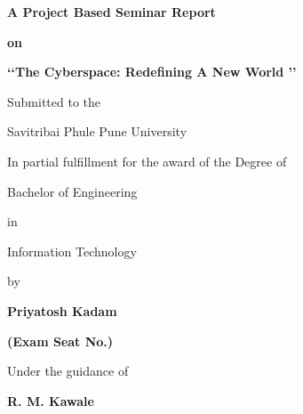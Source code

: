 \documentclass[11pt,a4paper]{article}
\begin{document}
\newpage
\pagestyle{empty}
 
\begin{center}
\textbf{\Large{A Project Based Seminar Report}}
\end{center}

\begin{center}\textbf{on}
\end{center}
			
\begin{center}
\textbf{ \Large{\textbf{ \lq \lq The Cyberspace: Redefining A New World \rq \rq}}}
\end{center}
     
\begin{center}Submitted to the 
\end{center}

\begin{center}\large{Savitribai Phule Pune University}
\end{center}

\begin{center}In partial fulfillment for the award of the Degree of
\end{center}

\begin{center}\large{Bachelor of Engineering} 
\end{center}

\begin{center}in
\end{center}

\begin{center}\large{Information Technology}
\end{center}

\begin{center}by
\end{center}

\begin{center}
\textbf{\Large{ \textbf{Priyatosh Kadam}}}
\end{center}

\begin{center}\textbf{(Exam Seat No.)}
\end{center}

\begin{center}Under the guidance of
\end{center}

\begin{center}\textbf{\Large{\textbf{R. M. Kawale}}}
\end{center}
\end{document}
